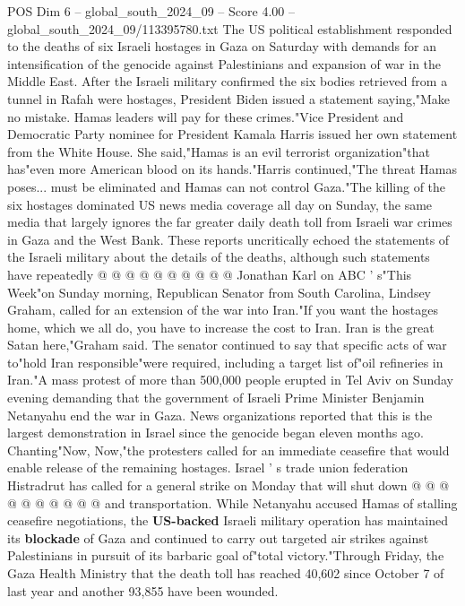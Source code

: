 \begin{textsample}{POS Dim 6 – global\_south\_2024\_09 – Score 4.00 – global\_south\_2024\_09/113395780.txt}  \label{ex:f6_pos_421}
The US political establishment responded to the deaths of six Israeli hostages in Gaza on Saturday with demands for an intensification of the genocide against Palestinians and expansion of war in the Middle East.
After the Israeli military confirmed the six bodies retrieved from a tunnel in Rafah were hostages, President Biden issued a statement saying,"Make no mistake.
Hamas leaders will pay for these crimes."Vice President and Democratic Party nominee for President Kamala Harris issued her own statement from the White House.
She said,"Hamas is an evil terrorist organization"that has"even more American blood on its hands."Harris continued,"The threat Hamas poses... must be eliminated and Hamas can not control Gaza."The killing of the six hostages dominated US news media coverage all day on Sunday, the same media that largely ignores the far greater daily death toll from Israeli war crimes in Gaza and the West Bank.
These reports uncritically echoed the statements of the Israeli military about the details of the deaths, although such statements have repeatedly @ @ @ @ @ @ @ @ @ @ Jonathan Karl on ABC ' s"This Week"on Sunday morning, Republican Senator from South Carolina, Lindsey Graham, called for an extension of the war into Iran."If you want the hostages home, which we all do, you have to increase the cost to Iran.
Iran is the great Satan here,"Graham said.
The senator continued to say that specific acts of war to"hold Iran responsible"were required, including a target list of"oil refineries in Iran."A mass protest of more than 500,000 people erupted in Tel Aviv on Sunday evening demanding that the government of Israeli Prime Minister Benjamin Netanyahu end the war in Gaza.
News organizations reported that this is the largest demonstration in Israel since the genocide began eleven months ago.
Chanting"Now, Now,"the protesters called for an immediate ceasefire that would enable release of the remaining hostages.
Israel ' s trade union federation Histradrut has called for a general strike on Monday that will shut down @ @ @ @ @ @ @ @ @ @ and transportation.
While Netanyahu accused Hamas of stalling ceasefire negotiations, the \textbf{US-backed} Israeli military operation has maintained its \textbf{blockade} of Gaza and continued to carry out targeted air strikes against Palestinians in pursuit of its barbaric goal of"total victory."Through Friday, the Gaza Health Ministry that the death toll has reached 40,602 since October 7 of last year and another 93,855 have been wounded.

\end{textsample}
